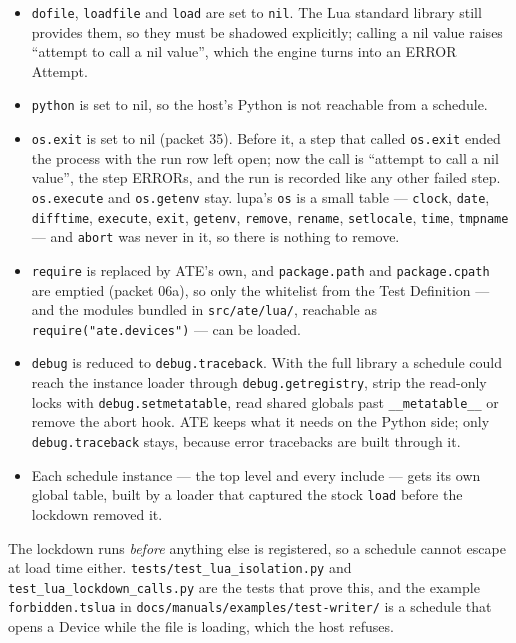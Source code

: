 \begin{itemize}
  \item \texttt{dofile}, \texttt{loadfile} and \texttt{load} are set to \texttt{nil}. The Lua standard
    library still provides them, so they must be shadowed explicitly; calling a nil value raises
    ``attempt to call a nil value'', which the engine turns into an ERROR Attempt.
  \item \texttt{python} is set to nil, so the host's Python is not reachable from a schedule.
  \item \texttt{os.exit} is set to nil (packet 35). Before it, a step that called \texttt{os.exit}
    ended the process with the run row left open; now the call is ``attempt to call a nil value'',
    the step ERRORs, and the run is recorded like any other failed step. \texttt{os.execute} and
    \texttt{os.getenv} stay. lupa's \texttt{os} is a small table --- \texttt{clock}, \texttt{date},
    \texttt{difftime}, \texttt{execute}, \texttt{exit}, \texttt{getenv}, \texttt{remove},
    \texttt{rename}, \texttt{setlocale}, \texttt{time}, \texttt{tmpname} --- and \texttt{abort} was
    never in it, so there is nothing to remove.
  \item \texttt{require} is replaced by ATE's own, and \texttt{package.path} and \texttt{package.cpath}
    are emptied (packet 06a), so only the whitelist from the Test Definition --- and the modules bundled
    in \texttt{src/ate/lua/}, reachable as \texttt{require("ate.devices")} --- can be loaded.
  \item \texttt{debug} is reduced to \texttt{debug.traceback}. With the full library a schedule could
    reach the instance loader through \texttt{debug.getregistry}, strip the read-only locks with
    \texttt{debug.setmetatable}, read shared globals past \texttt{\_\_metatable\_\_} or remove the abort
    hook. ATE keeps what it needs on the Python side; only \texttt{debug.traceback} stays, because error
    tracebacks are built through it.
  \item Each schedule instance --- the top level and every include --- gets its own global table, built by
    a loader that captured the stock \texttt{load} before the lockdown removed it.
\end{itemize}

The lockdown runs \emph{before} anything else is registered, so a schedule cannot escape at load time
either. \texttt{tests/\allowbreak{}test\_\allowbreak{}lua\_\allowbreak{}isolation.py} and \texttt{test\_\allowbreak{}lua\_\allowbreak{}lockdown\_\allowbreak{}calls.py} are the tests
that prove this, and the example \texttt{forbidden.tslua} in
\texttt{docs/\allowbreak{}manuals/\allowbreak{}examples/\allowbreak{}test-writer/\allowbreak} is a schedule that opens a Device while the file is loading,
which the host refuses.

